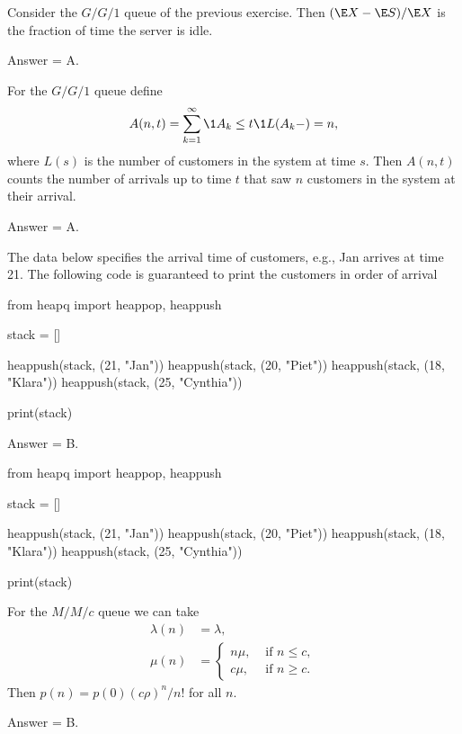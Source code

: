 \begin{exercise}[201903]
Consider the $G/G/1$ queue of the previous exercise. Then $(\E X - \E S)/\E X$ is the fraction of time the server is idle.

\begin{solution}
Answer = A.
\end{solution}
\end{exercise}

\begin{exercise}[201903]
For the $G/G/1$ queue define 
\begin{equation*}
 A(n,t) = \sum_{k=1}^\infty \1{A_k \leq t}\1{L(A_k-) = n},
\end{equation*}
where $L(s)$ is the number of customers in the system at time $s$.
Then $A(n,t)$ counts the number of arrivals up to time $t$ that saw $n$ customers in the system at their arrival.

\begin{solution}
Answer = A.
\end{solution}
\end{exercise}


\begin{exercise}[201903]
 The data below specifies the arrival time of customers, e.g., Jan arrives at time 21.
 The following code is guaranteed to print the customers in order of arrival
\begin{pyverbatim}
from heapq import heappop, heappush


stack = []

heappush(stack, (21, "Jan"))
heappush(stack, (20, "Piet"))
heappush(stack, (18, "Klara"))
heappush(stack, (25, "Cynthia"))

print(stack)
 \end{pyverbatim}
\begin{solution}
Answer = B.

\begin{pyconsole}
from heapq import heappop, heappush


stack = []

heappush(stack, (21, "Jan"))
heappush(stack, (20, "Piet"))
heappush(stack, (18, "Klara"))
heappush(stack, (25, "Cynthia"))

print(stack)
\end{pyconsole}


\end{solution}
\end{exercise}

\begin{exercise}[201903]
For the $M/M/c$ queue we can take
 \begin{align*}
\lambda(n) &= \lambda, \\
 \mu(n) &= 
 \begin{cases}
 n\mu, &\text{ if } n \leq c, \\
 c\mu, &\text{ if } n \geq c.
 \end{cases}
 \end{align*}
Then $p(n) = p(0) (c\rho)^n/n!$ for all $n$. 
\begin{solution}
Answer = B.
\end{solution}
\end{exercise}

